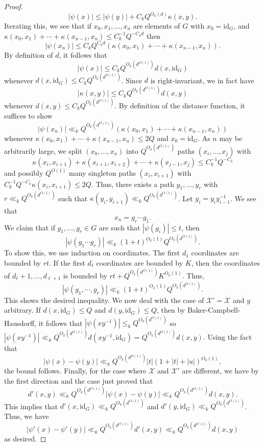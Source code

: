 \documentclass[11pt, a4paper]{amsart}
\theoremstyle{plain}
\theoremstyle{plain}
\theoremstyle{definition}
\theoremstyle{remark}
\numberwithin{equation}{section}
\numberwithin{lemma}{section}
\numberwithin{proposition}{section}
\numberwithin{corollary}{section}
\numberwithin{definition}{section}
\numberwithin{claim}{section}
\begin{document}
\begin{proof}
$$|\psi(x)| \le |\psi(y)| + C_k Q^{O_k(d)}\kappa(x, y).$$
Iterating this, we see that if $x_0, x_1, \dots, x_n$ are elements of $G$ with $x_0 = \mathrm{id}_G$, and $\kappa(x_0, x_1) + \cdots + \kappa(x_{n - 1}, x_n) \le C_k^{-1} Q^{-C_kd}$ then
$$|\psi(x_n)| \le C_k Q^{C_kd} (\kappa(x_0, x_1) + \cdots  + \kappa(x_{n - 1}, x_n)).$$
By definition of $d$, it follows that
$$|\psi(x)| \le C_kQ^{O_k(d^{O(1)})}d(x, \mathrm{id}_G)$$
whenever $d(x, \mathrm{id}_G) \le C_kQ^{O_k(d^{O(1)})}$. Since $d$ is right-invariant, we in fact have
$$|\kappa(x, y)| \le C_k Q^{O_k(d^{O(1)})} d(x, y)$$
whenever $d(x, y) \le C_k Q^{O_k(d^{O(1)})}$. By definition of the distance function, it suffices to show
$$|\psi(x_n)| \ll_k Q^{O_k(d^{O(1)})}(\kappa(x_0, x_1) + \cdots + \kappa(x_{n - 1}, x_n))$$
whenever $\kappa(x_0, x_1) + \cdots + \kappa(x_{n - 1}, x_n) \le 2Q$ and $x_0 = \mathrm{id}_G$. As $n$ may be arbitrarily large, we split $(x_0, \dots, x_n)$ into $Q^{O_k(d^{O(1)})}$ paths $(x_i, \dots, x_j)$ with
$$\kappa(x_i, x_{i + 1}) + \kappa(x_{i + 1}, x_{i + 2}) + \cdots + \kappa(x_{j - 1}, x_j) \le C_k^{-1}Q^{-C_k}$$
and possibly $Q^{O(1)}$ many singleton paths $(x_i, x_{i + 1})$ with $C_k^{-1}Q^{-C_k}\kappa(x_i, x_{i + 1}) \le 2Q$. Thus, there exists a path $y_1, \dots, y_r$ with $r \ll_k Q^{O_k(d^{O(1)})}$ such that $\kappa(y_i, y_{i + 1}) \ll_k Q^{O_k(d^{O(1)})}$. Let $g_i = y_iy_{i - 1}^{-1}$. We see that
$$x_n = g_r \cdots g_1.$$
We claim that if $g_1, \dots, g_r \in G$ are such that $|\psi(g_i)| \le t$, then
$$|\psi(g_1 \cdots g_r)| \ll_k (1 + t)^{O_k(1)} Q^{O_k(d^{O(1)})}.$$
To show this, we use induction on coordinates. The first $d_1$ coordinates are bounded by $rt$. If the first $d_\ell$ coordinates are bounded by $K$, then the coordinates of $d_\ell + 1, \dots, d_{\ell + 1}$ is bounded by $rt + Q^{O_k(d^{O(1)})} K^{O_k(1)}$. Thus,
$$|\psi(g_1, \cdots, g_r)| \ll_k (1 + t)^{O_k(1)} Q^{O_k(d^{O(1)})}.$$
This shows the desired inequality. We now deal with the case of $\mathcal{X}' = \mathcal{X}$ and $y$ arbitrary. If $d(x, \mathrm{id}_G) \le Q$ and $d(y, \mathrm{id}_G) \le Q$, then by Baker-Campbell-Hausdorff, it follows that $|\psi(xy^{-1})| \le_k Q^{O_k(d^{O(1)})}$ so $|\psi(xy^{-1})| \ll_k Q^{O_k(d^{O(1)})} d(xy^{-1}, \mathrm{id}_G) = Q^{O_k(d^{O(1)})} d(x, y).$ Using the fact that
$$|\psi(x) - \psi(y)| \ll_k Q^{O_k(d^{O(1)})} |t|(1 + |t| + |u|)^{O_k(1)},$$
the bound follows. Finally, for the case where $\mathcal{X}$ and $\mathcal{X}'$ are different, we have by the first direction and the case just proved that
$$d'(x, y) \ll_k Q^{O_k(d^{O(1)})}|\psi(x) - \psi(y)| \ll_k Q^{O_k(d^{O(1)})}d(x, y).$$
This implies that $d'(x, \mathrm{id}_G) \ll_k Q^{O_k(d^{O(1)})}$ and $d'(y, \mathrm{id}_G) \ll_k Q^{O_k(d^{O(1)})}$. Thus, we have
$$|\psi'(x) - \psi'(y)| \ll_k Q^{O_k(d^{O(1)})}d'(x, y) \ll_k Q^{O_k(d^{O(1)})} d(x, y)$$
as desired.
\end{proof}
\end{document}
